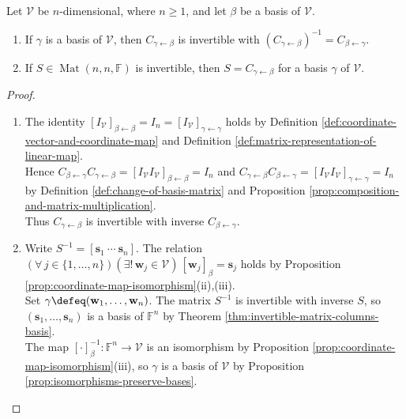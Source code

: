 \begin{theorem} \label{thm:change-of-basis-matrices} \\
Let $\mathcal{V}$ be $n$-dimensional, where $n\geq1$, and let $\beta$ be a basis of $\mathcal{V}$.
\begin{enumerate}[label=(\roman*)]
\setlength{\itemsep}{0pt}
\item If $\gamma$ is a basis of $\mathcal{V}$, then $C_{\gamma\leftarrow\beta}$ is invertible with $(C_{\gamma\leftarrow\beta})^{-1}=C_{\beta\leftarrow\gamma}$.
\item If $S\in\operatorname{Mat}(n,n,\mathbb{F})$ is invertible, then $S=C_{\gamma\leftarrow\beta}$ for a basis $\gamma$ of $\mathcal{V}$.
\end{enumerate}
\begin{proof}
\begin{enumerate}[label=(\roman*)]
\setlength{\itemsep}{0pt}
\item The identity $[I_{\mathcal{V}}]_{\beta\leftarrow\beta}=I_n=[I_{\mathcal{V}}]_{\gamma\leftarrow\gamma}$ holds by Definition \ref{def:coordinate-vector-and-coordinate-map} and Definition \ref{def:matrix-representation-of-linear-map}.\\
Hence $C_{\beta\leftarrow\gamma}C_{\gamma\leftarrow\beta}=[I_{\mathcal{V}}I_{\mathcal{V}}]_{\beta\leftarrow\beta}=I_n$ and $C_{\gamma\leftarrow\beta}C_{\beta\leftarrow\gamma}=[I_{\mathcal{V}}I_{\mathcal{V}}]_{\gamma\leftarrow\gamma}=I_n$ by Definition \ref{def:change-of-basis-matrix} and Proposition \ref{prop:composition-and-matrix-multiplication}.\\
Thus $C_{\gamma\leftarrow\beta}$ is invertible with inverse $C_{\beta\leftarrow\gamma}$.
\item Write $S^{-1}=[\mathbf{s}_1\ \cdots\ \mathbf{s}_n]$. The relation $(\forall\,j\in\{1,\ldots,n\})(\exists!\,\mathbf{w}_j\in\mathcal{V})\,[\mathbf{w}_j]_{\beta}=\mathbf{s}_j$ holds by Proposition \ref{prop:coordinate-map-isomorphism}(ii),(iii).\\
Set $\gamma\defeq(\mathbf{w}_1,\ldots,\mathbf{w}_n)$. The matrix $S^{-1}$ is invertible with inverse $S$, so $(\mathbf{s}_1,\ldots,\mathbf{s}_n)$ is a basis of $\mathbb{F}^n$ by Theorem \ref{thm:invertible-matrix-columns-basis}.\\
The map $[\cdot]_{\beta}^{-1}:\mathbb{F}^n\to\mathcal{V}$ is an isomorphism by Proposition \ref{prop:coordinate-map-isomorphism}(iii), so $\gamma$ is a basis of $\mathcal{V}$ by Proposition \ref{prop:isomorphisms-preserve-bases}.\\

\end{enumerate}
\end{proof}
\end{theorem}
